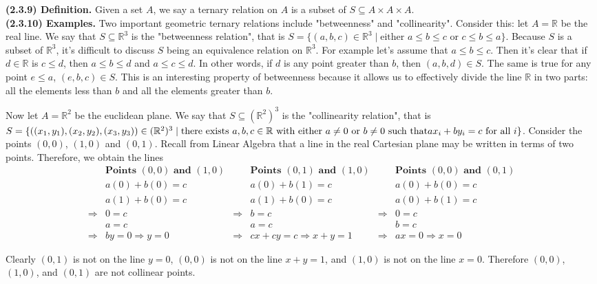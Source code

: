 \documentclass[12pt]{book}
\def\R{{\mathbb{R}}}
\begin{document}
\noindent\textbf{(2.3.9) Definition.} Given a set $A$, we say a ternary relation on $A$ is a subset of $S\subseteq A\times A\times A$.\\

\noindent\textbf{(2.3.10) Examples.} Two important geometric ternary relations include "betweenness" and "collinearity". Consider this: let $A=\R$ be the real line. We say that $S\subseteq\R^3$ is the "betweenness relation", that is $S=\{(a,b,c)\in \R^3\mid \text{either }a\leq b\leq c\text{ or } c\leq b\leq a\}$. Because $S$ is a subset of $\R^3$, it's difficult to discuss $S$ being an equivalence relation on $\R^3$. For example let's assume that $a\leq b\leq c$. Then it's clear that if $d\in\R$ is $c\leq d$, then $a\leq b\leq d$ and $a\leq c\leq d$. In other words, if $d$ is any point greater than $b$, then $(a,b,d)\in S$. The same is true for any point $e\leq a$, $(e,b,c)\in S$. This is an interesting property of betweenness because it allows us to effectively divide the line $\R$ in two parts: all the elements less than $b$ and all the elements greater than $b$.

Now let $A=\R^2$ be the euclidean plane. We say that $S\subseteq(\R^2)^3$ is the "collinearity relation", that is $S=\{((x_1,y_1),(x_2,y_2),(x_3,y_3))\in(\R^2)^3\mid \text{there exists }a,b,c\in\R\text{ with either } a\neq 0\text{ or } b\neq 0\text{ such that}\\ ax_i+by_i=c\text{ for all } i\}$. Consider the points $(0,0)$, $(1,0)$ and $(0,1)$. Recall from Linear Algebra that a line in the real Cartesian plane may be written in terms of two points. Therefore, we obtain the lines
\begin{align*}
& \textbf{Points $(0,0)$ and $(1,0)$} && \textbf{Points $(0,1)$ and $(1,0)$} && \textbf{Points $(0,0)$ and $(0,1)$}\\ 
 & a(0)+b(0)=c && a(0)+b(1)=c && a(0)+b(0)=c\\
 & a(1)+b(0)=c && a(1)+b(0)=c && a(0)+b(1)=c\\
 \Rightarrow & 0=c & \Rightarrow & b=c & \Rightarrow & 0=c \\
 & a=c 		   					&& a=c && b=c\\
 \Rightarrow & by=0 \Rightarrow y=0 & \Rightarrow & cx+cy=c \Rightarrow x+y=1 & \Rightarrow & ax=0 \Rightarrow x=0
\end{align*}

Clearly $(0,1)$ is not on the line $y=0$, $(0,0)$ is not on the line $x+y=1$, and $(1,0)$ is not on the line $x=0$. Therefore $(0,0)$, $(1,0)$, and $(0,1)$ are not collinear points.
\end{document}
